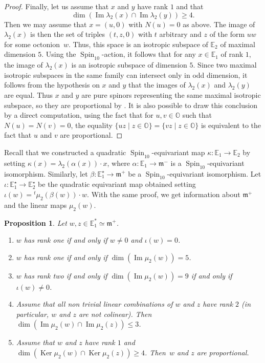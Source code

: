 \documentclass[JEP,XML,SOM,Unicode,NoFloatCountersInSection]{cedram}
\newenvironment{enumeratea}
{\bgroup\def\theenumi{\alph{enumi}}\begin{enumerate}}
{\end{enumerate}\egroup}
\newcommand{\citestar}[3]{\cite[#3]{#1}}
\theoremstyle{plain}
\newtheorem{prop}[theo]{Proposition}
\theoremstyle{definition}
\DeclareMathOperator{\im}{Im}\let\Im\im
\DeclareMathOperator{\Ker}{Ker}
\DeclareMathOperator{\Spin}{Spin}
\newcommand{\bE}{\mathbb{E}}
\newcommand{\bO}{\mathbb{O}}
\newcommand{\fm}{\mathfrak{m}}
\renewcommand{\iff}{if and only if }
\begin{document}
\begin{proof}
Finally, let us assume that $x$ and $y$ have rank $1$ and that $$\dim (\im \lambda_2(x) \cap \im \lambda_2(y)) \geq 4.$$
Then we may assume that $x=(u,0)$ with $N(u)=0$ as
above. The image of $\lambda_2(x)$ is then the set of triples $(t,z,0)$ with $t$ arbitrary and $z$ of the
form $uw$ for some octonion~$w$. Thus, this space is an isotropic subspace of $\bE_2$ of maximal dimension $5$.
Using the $\Spin_{10}$-action, it follows that for any $x \in \bE_1$ of rank $1$, the image of $\lambda_2(x)$
is an isotropic subspace of dimension $5$. Since two maximal isotropic subspaces
in the same family can intersect only
in odd dimension, it follows from the hypothesis on $x$ and $y$
that the images of $\lambda_2(x)$ and $\lambda_2(y)$ are equal. Thus
$x$ and $y$ are pure spinors representing the same maximal isotropic subspace, so they are
proportional by \citestar{chevalley}*{III.1.4}. It is also possible to draw this conclusion
by a direct computation, using the fact
that for $u,v \in \bO$ such that $N(u)=N(v)=0$, the equality
\hbox{$\{uz\mid z \in \bO\} = \{vz\mid z \in \bO\}$} is equivalent to the fact that $u$ and $v$ are proportional.	
\end{proof}

Recall that we constructed a quadratic $\Spin_{10}$-equivariant map $\kappa: \bE_1 \to \bE_2$ by setting
$\kappa(x)=\lambda_2(\alpha(x)) \cdot x$, where $\alpha: \bE_1 \to \fm^-$ is a $\Spin_{10}$-equivariant isomorphism.
Similarly, let $\beta:\bE_1^\star \to \fm^+$ be a $\Spin_{10}$-equivariant isomorphism.
Let $\iota: \bE^\star_1 \to \bE_2^\star$ be the quadratic equivariant map obtained setting
$\iota(w)={}^t \mu_2(\beta(w)) \cdot w$.
With the same proof, we get information about $\fm^+$ and the linear maps $\mu_2(w)$.

\begin{prop} \label{prop:fuplus}
Let $w,z \in \bE_1^* \simeq \fm^+$.
\begin{enumeratea}
\item $w$ has rank one \iff $w \neq 0$ and $\iota(w) = 0$.
\item $w$ has rank one \iff $\dim (\im \mu_2(w))=5$.
\item $w$ has rank two \iff $\dim (\im \mu_2(w))=9$ \iff $\iota(w) \neq 0$.
\item Assume that all non trivial linear combinations of $w$ and $z$ have rank $2$ (in particular,
$w$ and $z$ are not colinear). Then
$\dim (\im \mu_2(w) \cap \im \mu_2(z)) \leq 3$.
\item Assume that $w$ and $z$ have rank $1$ and $\dim (\Ker \mu_2(w) \cap \Ker \mu_2(z)) \geq 4$.
Then~$w$ and $z$ are proportional.
\end{enumeratea}
\end{prop}
\end{document}
